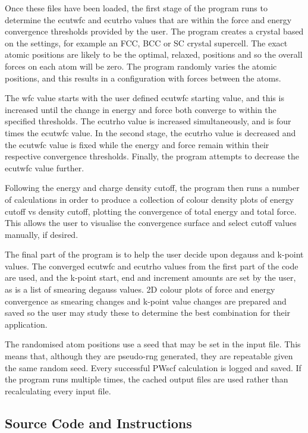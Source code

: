 Once these files have been loaded, the first stage of the program runs to determine the ecutwfc and ecutrho values that are within the force and energy convergence thresholds provided by the user.  The program creates a crystal based on the settings, for example an FCC, BCC or SC crystal supercell.  The exact atomic positions are likely to be the optimal, relaxed, positions and so the overall forces on each atom will be zero.  The program randomly varies the atomic positions, and this results in a configuration with forces between the atoms.

The wfc value starts with the user defined ecutwfc starting value, and this is increased until the change in energy and force both converge to within the specified thresholds.  The ecutrho value is increased simultaneously, and is four times the ecutwfc value.  In the second stage, the ecutrho value is decreased and the ecutwfc value is fixed while the energy and force remain within their respective convergence thresholds.  Finally, the program attempts to decrease the ecutwfc value further.

Following the energy and charge density cutoff, the program then runs a number of calculations in order to produce a collection of colour density plots of energy cutoff vs density cutoff, plotting the convergence of total energy and total force.  This allows the user to visualise the convergence surface and select cutoff values manually, if desired.

The final part of the program is to help the user decide upon degauss and k-point values.  The converged ecutwfc and ecutrho values from the first part of the code are used, and the k-point start, end and increment amounts are set by the user, as is a list of smearing degauss values.  2D colour plots of force and energy convergence as smearing changes and k-point value changes are prepared and saved so the user may study these to determine the best combination for their application.

The randomised atom positions use a seed that may be set in the input file.  This means that, although they are pseudo-rng generated, they are repeatable given the same random seed.  Every successful PWscf calculation is logged and saved.  If the program runs multiple times, the cached output files are used rather than recalculating every input file.


\subsection{Source Code and Instructions}

